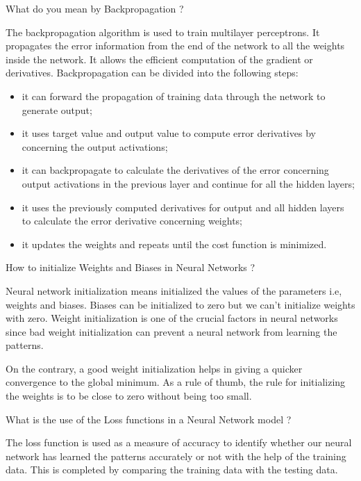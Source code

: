 \documentclass[12pt,a4paper]{exam}
\begin{document}

\question
What do you mean by Backpropagation ?
\fillwithlines{3cm}
\begin{solution}
The backpropagation algorithm is used to train multilayer perceptrons. It propagates the error information from the end of the network to all the weights inside the network. It allows the efficient computation of the gradient or derivatives.
Backpropagation can be divided into the following steps:
\begin{itemize}
\item it can forward the propagation of training data through the network to generate output;
\item it uses target value and output value to compute error derivatives by concerning the output activations;
\item it can backpropagate to calculate the derivatives of the error concerning output activations in the previous layer and continue for all the hidden layers;
\item it uses the previously computed derivatives for output and all hidden layers to calculate the error derivative concerning weights;
\item it updates the weights and repeats until the cost function is minimized.
\end{itemize}
\end{solution}


\question
How to initialize Weights and Biases in Neural Networks ?
\fillwithlines{3cm}
\begin{solution}
Neural network initialization means initialized the values of the parameters i.e, weights and biases. Biases can be initialized to zero but we can’t initialize weights with zero.
Weight initialization is one of the crucial factors in neural networks since bad weight initialization can prevent a neural network from learning the patterns.

On the contrary, a good weight initialization helps in giving a quicker convergence to the global minimum. As a rule of thumb, the rule for initializing the weights is to be close to zero without being too small.
\end{solution}


\question
What is the use of the Loss functions in a Neural Network model ?
\fillwithlines{3cm}
\begin{solution}
The loss function is used as a measure of accuracy to identify whether our neural network has learned the patterns accurately or not with the help of the training data.
This is completed by comparing the training data with the testing data.
\end{solution}
\end{document}
